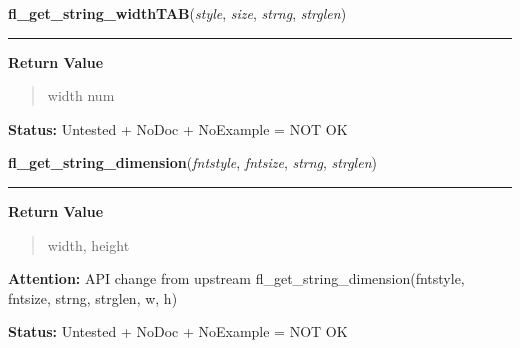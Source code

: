     \label{xformslib:library:fl_get_string_widthTAB}

    \vspace{0.5ex}

\hspace{.8\funcindent}\begin{boxedminipage}{\funcwidth}

    \raggedright \textbf{fl\_get\_string\_widthTAB}(\textit{style}, \textit{size}, \textit{strng}, \textit{strglen})

    \vspace{-1.5ex}

    \rule{\textwidth}{0.5\fboxrule}
\setlength{\parskip}{2ex}
\setlength{\parskip}{1ex}
      \textbf{Return Value}
    \vspace{-1ex}

      \begin{quote}
      width num

      \end{quote}

\textbf{Status:} Untested + NoDoc + NoExample = NOT OK



    \end{boxedminipage}

    \label{xformslib:library:fl_get_string_dimension}

    \vspace{0.5ex}

\hspace{.8\funcindent}\begin{boxedminipage}{\funcwidth}

    \raggedright \textbf{fl\_get\_string\_dimension}(\textit{fntstyle}, \textit{fntsize}, \textit{strng}, \textit{strglen})

    \vspace{-1.5ex}

    \rule{\textwidth}{0.5\fboxrule}
\setlength{\parskip}{2ex}
\setlength{\parskip}{1ex}
      \textbf{Return Value}
    \vspace{-1ex}

      \begin{quote}
      width, height

      \end{quote}

\textbf{Attention:} API change from upstream fl\_get\_string\_dimension(fntstyle, fntsize, 
strng, strglen, w, h)



\textbf{Status:} Untested + NoDoc + NoExample = NOT OK



    \end{boxedminipage}

